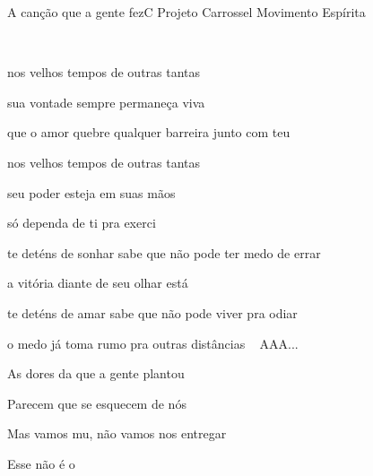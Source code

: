 \documentclass[a4,12pt,oneside]{book}
\newcommand{\RevDate}{\today}
\newcommand{\NotCCLIed}{\relax}
\begin{document}
\begin{song}{A canção que a gente fez}{C}
  {Projeto Carrossel}
  {Movimento Espírita}
  {}
  {\NotCCLIed}

	\renewcommand{\RevDate}{10 de setembro de 2016}
  
	\vspace{-1em}
	
	
	\ifChordBk
		{\vspace{-3em}\flushright{\Amchord \quad \Cchord \quad \Fchord \quad \Gchord}\\}
		\vspace{-1em}
	\fi

	\begin{SBVerse*}
		 nos velhos tempos de outras tantas

		 sua vontade sempre permaneça viva

		 que o amor quebre qualquer  barreira junto com teu 
	\end{SBVerse*}
	

	\begin{SBVerse*}
		 nos velhos tempos de outras tantas

		 seu poder esteja em suas mãos

		 só dependa de ti pra exerci\Ch{F}{tar}
	\end{SBVerse*}

	\begin{SBVerse*}
		 te deténs de sonhar sabe que não pode ter medo de errar

		 a vitória diante de seu olhar está
	\end{SBVerse*}


	\begin{SBVerse*}
		 te deténs de amar sabe que não pode viver pra odiar

		 o medo já toma rumo pra outras distâncias ~ AAA...
	\end{SBVerse*}


	\begin{SBVerse*}
		As dores da  que a gente plantou

		Parecem que  se esquecem de nós

		Mas vamos mu, não vamos nos entregar 
		
		Esse não é o \Ch{F}{fim}
	\end{SBVerse*}
	


\end{song}
\end{document}

